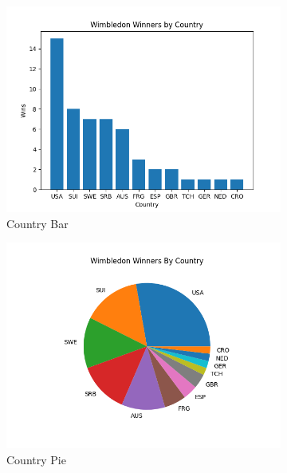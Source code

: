 \documentclass{article}
\begin{document}
\begin{figure}[h]
  \centering
  \begin{subfigure}[b]{0.3\linewidth}
    \centering
    \includegraphics[width=\linewidth]{PS6a_Rann.png}
    \caption{Country Bar}
    \label{fig:image1}
  \end{subfigure}
  \begin{subfigure}[b]{0.3\linewidth}
    \centering
    \includegraphics[width=\linewidth]{PS6b_Rann.png}
    \caption{Country Pie}
    \label{fig:image2}
  \end{subfigure}
  \begin{subfigure}[b]{0.3\linewidth}
    \centering

\end{subfigure}
\end{figure}
\end{document}
